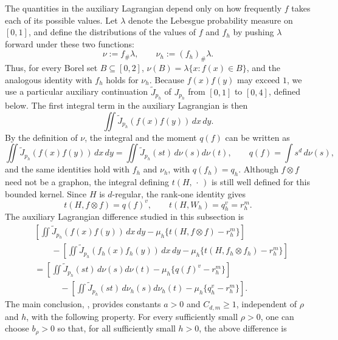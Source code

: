The quantities in the auxiliary Lagrangian depend only on how frequently $f$
takes each of its possible values.  Let $\lambda$ denote the Lebesgue
probability measure on $[0,1]$, and define the distributions of the values of
$f$ and $f_h$ by pushing $\lambda$ forward under these two functions:
\begin{equation*}
  \nu:=f_\#\lambda,
  \qquad
  \nu_h:=(f_h)_\#\lambda.
\end{equation*}
Thus, for every Borel set $B\subseteq[0,2]$,
$\nu(B)=\lambda\{x:f(x)\in B\}$, and the analogous identity with $f_h$ holds
for $\nu_h$.  Because $f(x)f(y)$ may exceed $1$, we use a particular auxiliary
continuation $\widetilde J_{p_h}$ of $J_{p_h}$ from $[0,1]$ to $[0,4]$, defined
below.  The first integral term in the auxiliary Lagrangian is then
\[
 \iint \widetilde J_{p_h}(f(x)f(y))\,dx\,dy.
\]
By the definition of $\nu$, the integral and the moment
$q(f)$ can be written as
\begin{equation*}
  \iint \widetilde J_{p_h}(f(x)f(y))\,dx\,dy
  =\iint \widetilde J_{p_h}(st)\,d\nu(s)d\nu(t),
  \qquad
  q(f)=\int s^d\,d\nu(s),
\end{equation*}
and the same identities hold with $f_h$ and $\nu_h$, with
$q(f_h)=q_h$.  Although $f\otimes f$ need not be a graphon, the integral
defining $t(H,\,\cdot\,)$ is still well defined for this bounded kernel.  Since
$H$ is $d$-regular, the rank-one identity gives
\begin{equation*}
  t(H,f\otimes f)=q(f)^v,
  \qquad
  t(H,W_h)=q_h^v=r_h^m.
\end{equation*}
The auxiliary Lagrangian difference studied in this subsection is
\begin{align*}
  &\left[
    \iint \widetilde J_{p_h}(f(x)f(y))\,dx\,dy
    -\mu_h\{t(H,f\otimes f)-r_h^m\}
  \right]
  \\
  &\qquad-
  \left[
    \iint \widetilde J_{p_h}(f_h(x)f_h(y))\,dx\,dy
    -\mu_h\{t(H,f_h\otimes f_h)-r_h^m\}
  \right]
  \\
  & {} = \left[
    \iint \widetilde J_{p_h}(st)\,d\nu(s)d\nu(t)
    -\mu_h\{q(f)^v-r_h^m\}
  \right]
  \\
  &\qquad\quad-
  \left[
    \iint \widetilde J_{p_h}(st)\,d\nu_h(s)d\nu_h(t)
    -\mu_h\{q_h^v-r_h^m\}
  \right].
\end{align*}
The main conclusion, , provides
constants $a>0$ and $C_{d,m}\ge1$, independent of $\rho$ and $h$, with the
following property.  For every sufficiently small $\rho>0$, one can choose
$b_\rho>0$ so that, for all sufficiently small $h>0$, the above difference is
